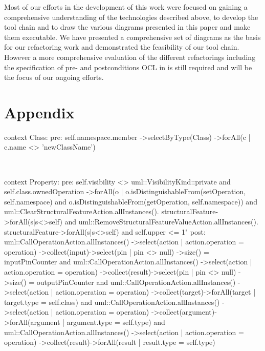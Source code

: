 \documentclass{llncs}
\begin{document}
Most of our efforts in the development of this work were focused on gaining a comprehensive understanding of the
technologies described above, to develop the tool chain and to draw the various diagrams presented in this paper and make 
them executable. We have presented a comprehensive set of diagrams as the basis for our refactoring work and demonstrated 
the feasibility of our tool chain. However a more comprehensive evaluation of the different refactorings including the 
specification of pre- and postconditions OCL in is still required and will be the focus of our ongoing efforts.

\newpage



\newpage
\appendix
\section{Appendix}
\label{sec:appendix}

\begin{lstsingle}[language=OCL,caption=OCL for \textit{rename class} refactoring,label=lst:renameclass]
context Class:
pre:  self.namespace.member
      ->selectByType(Class)
      ->forAll(c | c.name <> 'newClassName')
\end{lstsingle}
\\
\begin{lstsingle}[language=OCL,caption=OCL for \textit{encapsulate property} refactoring,label=lst:encapsulate]
context Property:
pre:  self.visibility <> uml::VisibilityKind::private 
      and 
      self.class.ownedOperation
        ->forAll(o | o.isDistinguishableFrom(setOperation, 
            self.namespace)
          and 
          o.isDistinguishableFrom(getOperation, 
            self.namespace)) 
      and 
      uml::ClearStructuralFeatureAction.allInstances().
        structuralFeature->forAll(s|s<>self)
      and
      uml::RemoveStructuralFeatureValueAction.allInstances().
        structuralFeature->forAll(s|s<>self)
      and
      self.upper <= 1"
post: uml::CallOperationAction.allInstances()
        ->select(action | action.operation = operation)
        ->collect(input)->select(pin | pin <> null)
        ->size() = inputPinCounter
      and
      uml::CallOperationAction.allInstances()
        ->select(action | action.operation = operation)
        ->collect(result)->select(pin | pin <> null)
        ->size() = outputPinCounter
      and
      uml::CallOperationAction.allInstances()
        ->select(action | action.operation = operation)
        ->collect(target)->forAll(target | target.type 
        = self.class)
      and 
      uml::CallOperationAction.allInstances()
        ->select(action | action.operation = operation)
        ->collect(argument)->forAll(argument | argument.type 
        = self.type)
      and
      uml::CallOperationAction.allInstances()
        ->select(action | action.operation = operation)
        ->collect(result)->forAll(result | result.type 
        = self.type)
\end{lstsingle}
\end{document}
